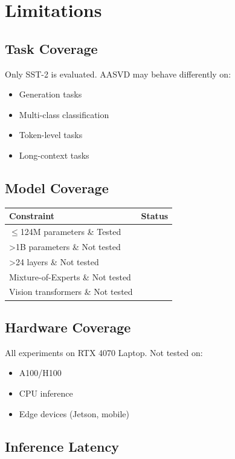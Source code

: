 
\section{Limitations}

\subsection{Task Coverage}

Only SST-2 is evaluated. AASVD may behave differently on:
\begin{itemize}
\item Generation tasks
\item Multi-class classification
\item Token-level tasks
\item Long-context tasks

\end{itemize}
\subsection{Model Coverage}

\begin{table}[H]
\centering
\small
\begin{tabular}{ll}
\toprule
\textbf{Constraint} & \textbf{Status} \\
\midrule
$\le$124M parameters \& Tested \\
>1B parameters \& Not tested \\
>24 layers \& Not tested \\
Mixture-of-Experts \& Not tested \\
Vision transformers \& Not tested \\
\bottomrule
\end{tabular}
\end{table}

\subsection{Hardware Coverage}

All experiments on RTX 4070 Laptop. Not tested on:
\begin{itemize}
\item A100/H100
\item CPU inference
\item Edge devices (Jetson, mobile)

\end{itemize}
\subsection{Inference Latency}

